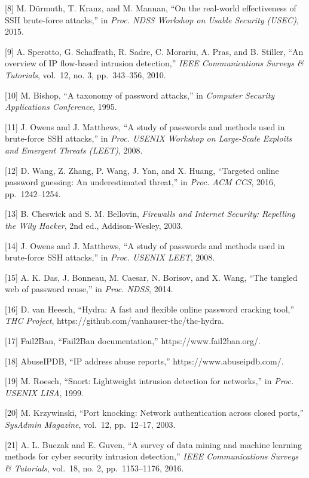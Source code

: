 \documentclass[
  a4paper]{report}
\begin{document}
{[}8{]} M. Dürmuth, T. Kranz, and M. Mannan, ``On the real-world
effectiveness of SSH brute-force attacks,'' in \emph{Proc. NDSS Workshop
on Usable Security (USEC)}, 2015.

{[}9{]} A. Sperotto, G. Schaffrath, R. Sadre, C. Morariu, A. Pras, and
B. Stiller, ``An overview of IP flow-based intrusion detection,''
\emph{IEEE Communications Surveys \& Tutorials}, vol.~12, no. 3,
pp.~343--356, 2010.

{[}10{]} M. Bishop, ``A taxonomy of password attacks,'' in
\emph{Computer Security Applications Conference}, 1995.

{[}11{]} J. Owens and J. Matthews, ``A study of passwords and methods
used in brute-force SSH attacks,'' in \emph{Proc. USENIX Workshop on
Large-Scale Exploits and Emergent Threats (LEET)}, 2008.

{[}12{]} D. Wang, Z. Zhang, P. Wang, J. Yan, and X. Huang, ``Targeted
online password guessing: An underestimated threat,'' in \emph{Proc. ACM
CCS}, 2016, pp.~1242--1254.

{[}13{]} B. Cheswick and S. M. Bellovin, \emph{Firewalls and Internet
Security: Repelling the Wily Hacker}, 2nd ed., Addison-Wesley, 2003.

{[}14{]} J. Owens and J. Matthews, ``A study of passwords and methods
used in brute-force SSH attacks,'' in \emph{Proc. USENIX LEET}, 2008.

{[}15{]} A. K. Das, J. Bonneau, M. Caesar, N. Borisov, and X. Wang,
``The tangled web of password reuse,'' in \emph{Proc. NDSS}, 2014.

{[}16{]} D. van Heesch, ``Hydra: A fast and flexible online password
cracking tool,'' \emph{THC Project},
https://github.com/vanhauser-thc/thc-hydra.

{[}17{]} Fail2Ban, ``Fail2Ban documentation,''
https://www.fail2ban.org/.

{[}18{]} AbuseIPDB, ``IP address abuse reports,''
https://www.abuseipdb.com/.

{[}19{]} M. Roesch, ``Snort: Lightweight intrusion detection for
networks,'' in \emph{Proc. USENIX LISA}, 1999.

{[}20{]} M. Krzywinski, ``Port knocking: Network authentication across
closed ports,'' \emph{SysAdmin Magazine}, vol.~12, pp.~12--17, 2003.

{[}21{]} A. L. Buczak and E. Guven, ``A survey of data mining and
machine learning methods for cyber security intrusion detection,''
\emph{IEEE Communications Surveys \& Tutorials}, vol.~18, no. 2,
pp.~1153--1176, 2016.
\end{document}
